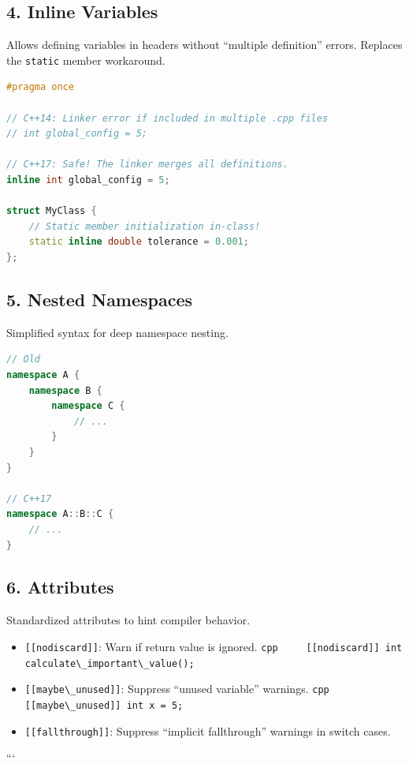 \hypertarget{inline-variables}{%
\subsection{4. Inline Variables}\label{inline-variables}}

Allows defining variables in headers without ``multiple definition''
errors. Replaces the \passthrough{\lstinline!static!} member workaround.

\begin{lstlisting}[language={C++}]
#pragma once

// C++14: Linker error if included in multiple .cpp files
// int global_config = 5;

// C++17: Safe! The linker merges all definitions.
inline int global_config = 5;

struct MyClass {
    // Static member initialization in-class!
    static inline double tolerance = 0.001;
};
\end{lstlisting}

\hypertarget{nested-namespaces}{%
\subsection{5. Nested Namespaces}\label{nested-namespaces}}

Simplified syntax for deep namespace nesting.

\begin{lstlisting}[language={C++}]
// Old
namespace A {
    namespace B {
        namespace C {
            // ...
        }
    }
}

// C++17
namespace A::B::C {
    // ...
}
\end{lstlisting}

\hypertarget{attributes}{%
\subsection{6. Attributes}\label{attributes}}

Standardized attributes to hint compiler behavior.

\begin{itemize}
\tightlist
\item
  \passthrough{\lstinline![[nodiscard]]!}: Warn if return value is
  ignored.
  \passthrough{\lstinline!cpp     [[nodiscard]] int calculate\_important\_value();!}
\item
  \passthrough{\lstinline![[maybe\_unused]]!}: Suppress ``unused
  variable'' warnings.
  \passthrough{\lstinline!cpp     [[maybe\_unused]] int x = 5;!}
\item
  \passthrough{\lstinline![[fallthrough]]!}: Suppress ``implicit
  fallthrough'' warnings in switch cases.
\end{itemize}

```
